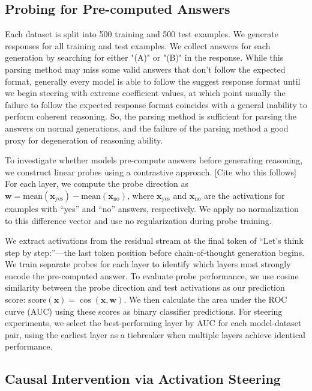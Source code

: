 \documentclass{article}
\begin{document}
\subsection{Probing for Pre-computed Answers}

Each dataset is split into 500 training and 500 test examples. We generate responses for all training and test examples. We collect answers for each generation by searching for either "(A)" or "(B)" in the response. While this parsing method may miss some valid answers that don't follow the expected format, generally every model is able to follow the suggest response format until we begin steering with extreme coefficient values, at which point usually the failure to follow the expected response format coincides with a general inability to perform coherent reasoning. So, the parsing method is sufficient for parsing the answers on normal generations, and the failure of the parsing method a good proxy for degeneration of reasoning ability.

To investigate whether models pre-compute answers before generating reasoning, we construct linear probes using a contrastive approach. [Cite who this follows] For each layer, we compute the probe direction as $\mathbf{w} = \text{mean}(\mathbf{x}_{\text{yes}}) - \text{mean}(\mathbf{x}_{\text{no}})$, where $\mathbf{x}_{\text{yes}}$ and $\mathbf{x}_{\text{no}}$ are the activations for examples with ``yes'' and ``no'' answers, respectively. We apply no normalization to this difference vector and use no regularization during probe training.

We extract activations from the residual stream at the final token of ``Let's think step by step:''---the last token position before chain-of-thought generation begins. We train separate probes for each layer to identify which layers most strongly encode the pre-computed answer. To evaluate probe performance, we use cosine similarity between the probe direction and test activations as our prediction score: $\text{score}(\mathbf{x}) = \cos(\mathbf{x}, \mathbf{w})$. We then calculate the area under the ROC curve (AUC) using these scores as binary classifier predictions. For steering experiments, we select the best-performing layer by AUC for each model-dataset pair, using the earliest layer as a tiebreaker when multiple layers achieve identical performance.

\subsection{Causal Intervention via Activation Steering}
\end{document}
